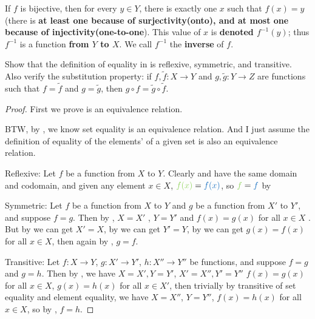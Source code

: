 \begin{definition}  \label{def 3.3.25}
If \(f\) is bijective, then for every \(y \in Y\), there is exactly one \(x\) such that \(f(x) = y\) (there is \textbf{at least one because of surjectivity(onto),
and at most one because of injectivity(one-to-one}).
This value of \(x\) is \textbf{denoted \(f^{-1}(y)\)}; thus \(f^{-1}\) is a function \textbf{from \(Y\) to \(X\)}. We call \(f^{-1}\) the \textbf{inverse} of \(f\).
\end{definition}

\exercisesection

\begin{exercise} \label{exercise 3.3.1}
Show that the definition of equality in  is reflexive, symmetric, and transitive.
Also verify the substitution property: if \(f, \tilde{f} : X \rightarrow Y\) and \(g, \tilde{g} : Y \rightarrow Z\) are functions such that \(f = \tilde{f}\) and \(g = \tilde{g}\), then \(g \circ f = \tilde{g} \circ \tilde{f}\).
\end{exercise}

\begin{proof}
First we prove  is an equivalence relation.

BTW, by , we know set equality is an equivalence relation. And I just assume the definition of equality of the elements' of a given set is also an equivalence relation.

Reflexive: Let \(f\) be a function from \(X\) to \(Y\).
Clearly  and  have the same domain and codomain, and given any element \(x \in X\), \(\GREEN{f(x)} = \BLUE{f(x)}\), so \(\GREEN{f} = \BLUE{f}\) by 

Symmetric: Let \(f\) be a function from \(X\) to \(Y\) and \(g\) be a function from \(X'\) to \(Y'\), and suppose \(f = g\).
Then by , \(X = X'\) , \(Y = Y'\)  and \(f(x) = g(x)\) for all \(x \in X\) .
But by  we can get \(X' = X\), by  we can get \(Y' = Y\), by  we can get \(g(x) = f(x)\) for all \(x \in X\), then again by , \(g = f\).

Transitive: Let \(f : X \rightarrow Y\), \(g : X' \rightarrow Y'\), \(h : X'' \rightarrow Y''\) be functions, and suppose \(f = g\) and \(g = h\).
Then by , we have \(X = X', Y = Y'\), \(X' = X'', Y' = Y''\) \(f(x) = g(x)\) for all \(x \in X\), \(g(x) = h(x)\) for all \(x \in X'\),
then trivially by transitive of set equality and element equality, we have \(X = X''\), \(Y = Y''\), \(f(x) = h(x)\) for all \(x \in X\), so by , \(f = h\).
\end{proof}

